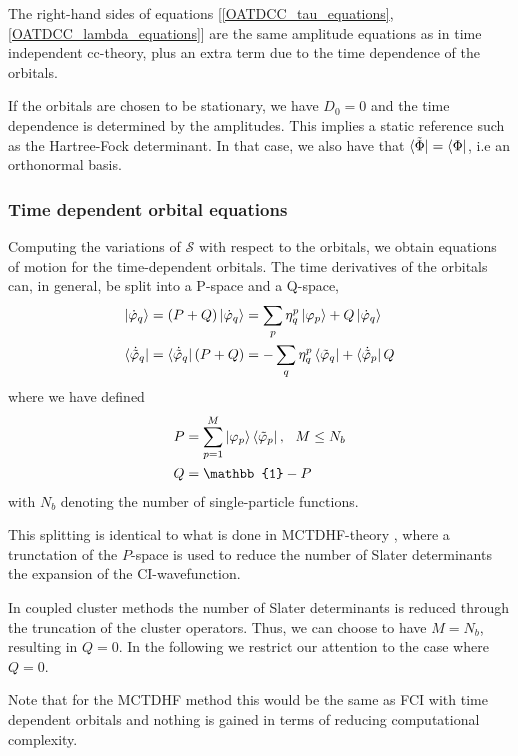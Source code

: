 \documentclass[aip,jcp,reprint,floatfix]{revtex4-1}
\begin{document}
The right-hand sides of equations [\ref{OATDCC_tau_equations}, \ref{OATDCC_lambda_equations}] are the same amplitude equations as in time independent cc-theory, plus an extra term due to the time dependence of the orbitals. 

If the orbitals are chosen to be stationary\cite{Symplectic_TDCC_2018}, we have $D_0 = 0$ and the time dependence is determined by the amplitudes. This implies a static reference such as the Hartree-Fock determinant. In that case, we also have that $\bra{\tilde{\Phi}} = \bra{\Phi} $, i.e an orthonormal basis.

\subsubsection{Time dependent orbital equations}
Computing the variations of $\mathcal{S}$ with respect to the orbitals, we obtain equations of motion for the time-dependent orbitals. The time derivatives of the orbitals can, in general, be split into a P-space and a Q-space, 
\begin{align}
    \ket{\dot{\varphi}_q} &= (P+Q)\ket{\dot{\varphi}_q} = \sum_p \eta^p_q \ket{\varphi_p} + Q\ket{\dot{\varphi}_q} \\
    \bra{\dot{\tilde{\varphi}}_q} &= \bra{\dot{\tilde{\varphi}}_q}(P+Q) = -\sum_q \eta^p_q \bra{\tilde{\varphi}_q} + \bra{\dot{\tilde{\varphi}}_p}Q
\end{align}
where we have defined 
\begin{align}
    P &= \sum_{p=1}^M \ket{\varphi_p}\bra{\tilde{\varphi}_p},  \ \ M \leq N_b \\
    Q &= \mathbb{1}-P
\end{align}
with $N_b$ denoting the number of single-particle functions. 

This splitting is identical to what is done in MCTDHF-theory \cite{Hochstuhl2014}, where a trunctation of the $P$-space is used to reduce the number of Slater determinants the expansion of the CI-wavefunction. 

In coupled cluster methods the number of Slater determinants is reduced through the truncation of the cluster operators. Thus, we can choose to have $M=N_b$, resulting in $Q=0$. In the following we restrict our attention to the case where $Q=0$.

Note that for the MCTDHF method this would be the same as FCI with time dependent orbitals and nothing is gained in terms of reducing computational complexity.  
\end{document}
